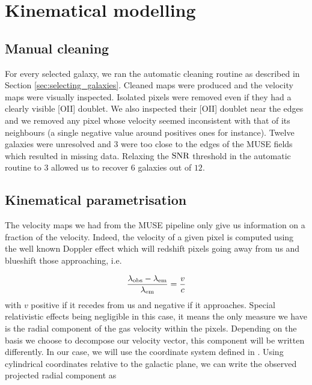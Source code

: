 \clearpage
\section{Kinematical modelling}
\label{sec:kinematical_modelling}

\subsection{Manual cleaning}

For every selected galaxy, we ran the automatic cleaning routine as described in Section \ref{sec:selecting_galaxies}. Cleaned maps were produced and the velocity maps were visually inspected. Isolated pixels were removed even if they had a clearly visible [OII] doublet. We also inspected their [OII] doublet near the edges and we removed any pixel whose velocity seemed inconsistent with that of its neighbours (a single negative value around positives ones for instance). Twelve galaxies were unresolved and $3$ were too close to the edges of the MUSE fields which resulted in missing data. Relaxing the $\rm{SNR}$ threshold in the automatic routine to $3$ allowed us to recover $6$ galaxies out of $12$. 

\subsection{Kinematical parametrisation}

The velocity maps we had from the MUSE pipeline only give us information on a fraction of the velocity. Indeed, the velocity of a given pixel is computed using the well known Doppler effect which will redshift pixels going away from us and blueshift those approaching, i.e.

\begin{equation}
	\frac{\lambda_{\rm{obs}} - \lambda_{\rm{em}}}{\lambda_{\rm{em}}} = \frac{v}{c}
\end{equation}
with $v$ positive if it recedes from us and negative if it approaches. Special relativistic effects being negligible in this case, it means the only measure we have is the radial component of the gas velocity within the pixels. Depending on the basis we choose to decompose our velocity vector, this component will be written differently. In our case, we will use the coordinate system defined in . Using cylindrical coordinates relative to the galactic plane, we can write the observed projected radial component as 

